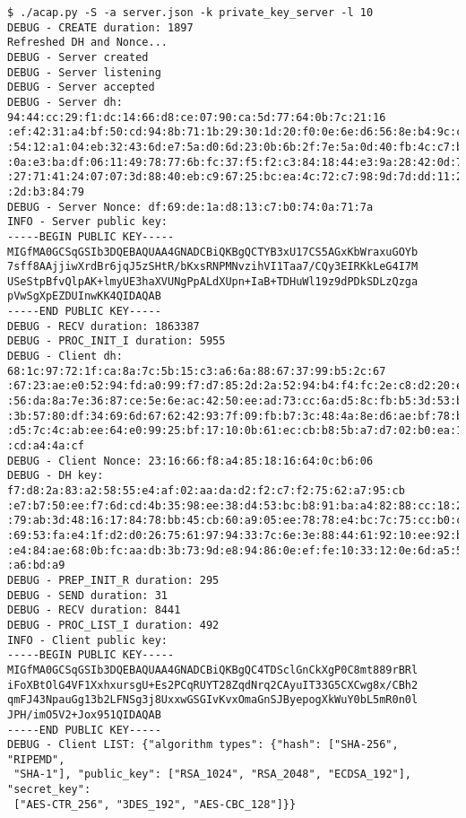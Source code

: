 \begin{subappendices}
\begin{small}
\begin{verbatim}
$ ./acap.py -S -a server.json -k private_key_server -l 10
DEBUG - CREATE duration: 1897
Refreshed DH and Nonce...
DEBUG - Server created
DEBUG - Server listening
DEBUG - Server accepted
DEBUG - Server dh: 94:44:cc:29:f1:dc:14:66:d8:ce:07:90:ca:5d:77:64:0b:7c:21:16
:ef:42:31:a4:bf:50:cd:94:8b:71:1b:29:30:1d:20:f0:0e:6e:d6:56:8e:b4:9c:cd:58:5f
:54:12:a1:04:eb:32:43:6d:e7:5a:d0:6d:23:0b:6b:2f:7e:5a:0d:40:fb:4c:c7:bd:ee:b7
:0a:e3:ba:df:06:11:49:78:77:6b:fc:37:f5:f2:c3:84:18:44:e3:9a:28:42:0d:76:ea:59
:27:71:41:24:07:07:3d:88:40:eb:c9:67:25:bc:ea:4c:72:c7:98:9d:7d:dd:11:25:50:b5
:2d:b3:84:79
DEBUG - Server Nonce: df:69:de:1a:d8:13:c7:b0:74:0a:71:7a
INFO - Server public key:
-----BEGIN PUBLIC KEY-----
MIGfMA0GCSqGSIb3DQEBAQUAA4GNADCBiQKBgQCTYB3xU17CS5AGxKbWraxuGOYb
7sff8AAjjiwXrdBr6jqJ5zSHtR/bKxsRNPMNvzihVI1Taa7/CQy3EIRKkLeG4I7M
USeStpBfvQlpAK+lmyUE3haXVUNgPpALdXUpn+IaB+TDHuWl19z9dPDkSDLzQzga
pVwSgXpEZDUInwKK4QIDAQAB
-----END PUBLIC KEY-----
DEBUG - RECV duration: 1863387
DEBUG - PROC_INIT_I duration: 5955
DEBUG - Client dh: 68:1c:97:72:1f:ca:8a:7c:5b:15:c3:a6:6a:88:67:37:99:b5:2c:67
:67:23:ae:e0:52:94:fd:a0:99:f7:d7:85:2d:2a:52:94:b4:f4:fc:2e:c8:d2:20:ec:9b:0a
:56:da:8a:7e:36:87:ce:5e:6e:ac:42:50:ee:ad:73:cc:6a:d5:8c:fb:b5:3d:53:bb:32:21
:3b:57:80:df:34:69:6d:67:62:42:93:7f:09:fb:b7:3c:48:4a:8e:d6:ae:bf:78:b6:ca:2b
:d5:7c:4c:ab:ee:64:e0:99:25:bf:17:10:0b:61:ec:cb:b8:5b:a7:d7:02:b0:ea:1e:03:8a
:cd:a4:4a:cf
DEBUG - Client Nonce: 23:16:66:f8:a4:85:18:16:64:0c:b6:06
DEBUG - DH key: f7:d8:2a:83:a2:58:55:e4:af:02:aa:da:d2:f2:c7:f2:75:62:a7:95:cb
:e7:b7:50:ee:f7:6d:cd:4b:35:98:ee:38:d4:53:bc:b8:91:ba:a4:82:88:cc:18:2d:55:fd
:79:ab:3d:48:16:17:84:78:bb:45:cb:60:a9:05:ee:78:78:e4:bc:7c:75:cc:b0:c0:a2:7e
:69:53:fa:e4:1f:d2:d0:26:75:61:97:94:33:7c:6e:3e:88:44:61:92:10:ee:92:bc:71:ab
:e4:84:ae:68:0b:fc:aa:db:3b:73:9d:e8:94:86:0e:ef:fe:10:33:12:0e:6d:a5:59:ac:78
:a6:bd:a9
DEBUG - PREP_INIT_R duration: 295
DEBUG - SEND duration: 31
DEBUG - RECV duration: 8441
DEBUG - PROC_LIST_I duration: 492
INFO - Client public key:
-----BEGIN PUBLIC KEY-----
MIGfMA0GCSqGSIb3DQEBAQUAA4GNADCBiQKBgQC4TDSclGnCkXgP0C8mt889rBRl
iFoXBtOlG4VF1XxhxursgU+Es2PCqRUYT28ZqdNrq2CAyuIT33G5CXCwg8x/CBh2
qmFJ43NpauGg13b2LFNSg3j8UxxwGSGIvKvxOmaGnSJByepogXkWuY0bL5mR0n0l
JPH/imO5V2+Jox951QIDAQAB
-----END PUBLIC KEY-----
DEBUG - Client LIST: {"algorithm types": {"hash": ["SHA-256", "RIPEMD",
 "SHA-1"], "public_key": ["RSA_1024", "RSA_2048", "ECDSA_192"], "secret_key":
 ["AES-CTR_256", "3DES_192", "AES-CBC_128"]}}

\end{verbatim}
\end{small}
\end{subappendices}

